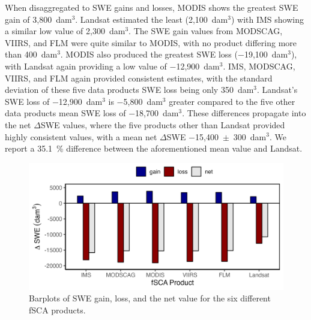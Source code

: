 \clearpage
When disaggregated to SWE gains and losses, MODIS shows the greatest SWE gain of 3,800~dam$^{3}$. Landsat estimated the least (2,100~dam$^{3}$) with IMS showing a similar low value of 2,300~dam$^{3}$. The SWE gain values from MODSCAG, VIIRS, and FLM were quite similar to MODIS, with no product differing more than 400~dam$^{3}$.
MODIS also produced the greatest SWE loss ($-$19,100~dam$^{3}$), with Landsat again providing a low value of $-$12,900~dam$^{3}$. IMS, MODSCAG, VIIRS, and FLM again provided consistent estimates, with the standard deviation of these five data products SWE loss being only 350~dam$^{3}$. Landsat's SWE loss of $-$12,900~dam$^{3}$ is $-$5,800~dam$^{3}$ greater compared to the five other data products mean SWE loss of $-$18,700~dam$^{3}$. These differences propagate into the net $\Delta$SWE values, where the five products other than Landsat provided highly consistent values, with a mean net $\Delta$SWE $-$15,400~$\pm$~300~dam$^{3}$. We report a 35.1~\% difference between the aforementioned mean value and Landsat.


\begin{figure}[]
\centering
\includegraphics[width=\textwidth]{figures/ch4_figs/dswe_stats_dam3_v1.png}
\caption{Barplots of SWE gain, loss, and the net value for the six different fSCA products.}
\label{fig:dswe_bar_graph}
\end{figure}

